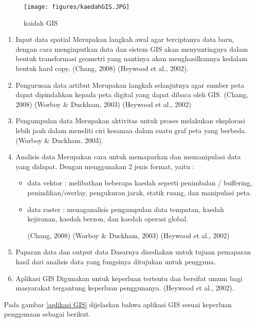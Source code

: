 \begin{figure}[ht]
	\centerline{\texttt{[image: figures/kaedahGIS.JPG]}}
	\caption{kaidah GIS}
	\label{kaidah GIS}
	\end{figure}


\begin{enumerate}
\item Input data spatial
Merupakan langkah awal agar terciptanya data baru, dengan cara menginputkan data dan sistem GIS akan menyuntingnya dalam bentuk transformasi geometri yang nantinya akan menghasilkannya kedalam bentuk hard copy. (Chang, 2008) 
(Heywood et al., 2002).

\item Pengurusan data artibut
Merupakan langkah selanjutnya agar sumber peta dapat dipindahkan kepada peta digital yang dapat dibaca oleh GIS.
(Chang, 2008) (Worboy \& Duckham, 2003) (Heywood et al., 2002)

\item Pengumpulan data
Merupakan aktivitas untuk proses melakukan eksplorasi lebih jauh dalam meneliti ciri kesamaa dalam suatu graf peta yang berbeda. (Worboy \& Duckham, 2003).

\item Analisis data
Merupakan cara untuk memaparkan dan memanipulasi data yang didapat. Dengan menggunakan 2 jenis format, yaitu :
\begin{itemize}
\item data vektor : melibatkan beberapa kaedah seperti penimbalan / buffering, penindihan/overlay, pengukuran jarak, statik ruang, dan manipulasi peta.
\item data raster : menaganalisis pengumpulan data tempatan, kaedah kejiranan, kaedah berzon, dan kaedah operasi global.

(Chang, 2008) (Worboy \& Duckham, 2003) (Heywood et al., 2002)
\end{itemize}

\item Paparan data dan output data
Dasarnya disediakan untuk tujuan pemaparan hasil dari analisis data yang fungsinya ditujukan untuk pengguna.

\item Aplikasi GIS
Digunakan untuk keperluan tertentu dan bersifat umum bagi masyarakat tergantung keperluan penggunanya. 
(Heywood et al., 2002).
\end{enumerate}


Pada gambar \ref{aplikasi GIS} dijelaskan bahwa aplikasi GIS sesuai keperluan penggunaan sebagai berikut.

